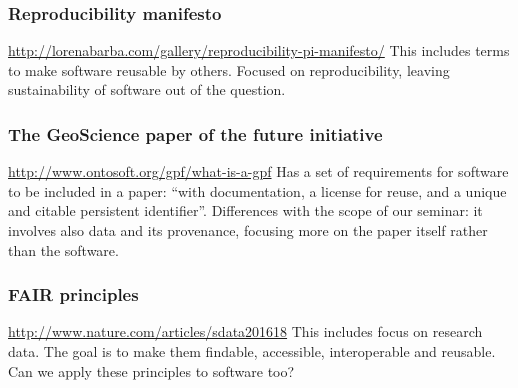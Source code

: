 \documentclass[a4paper,UKenglish]{dagman}
\renewcommand{\paragraph}[1]{\subsubsection*{#1}\xspace}
\begin{document}
\begin{appendix}
\paragraph{Reproducibility manifesto}
\url{http://lorenabarba.com/gallery/reproducibility-pi-manifesto/}
\cite{barba_reproducibility_2012}
This includes terms to make software reusable by others. Focused on reproducibility, leaving sustainability of software out of the question.

\paragraph{The GeoScience paper of the future initiative}
\url{http://www.ontosoft.org/gpf/what-is-a-gpf}
\cite{onto_soft_what_2016}
Has a set of requirements for software to be included in a paper: ``with documentation, a license for reuse, and a unique and citable persistent identifier''. Differences with the scope of our seminar: it involves also data and its provenance, focusing more on the paper itself rather than the software.

\paragraph{FAIR principles}
\url{http://www.nature.com/articles/sdata201618}
\cite{wilkinson_fair_2016}
This includes focus on research data. The goal is to make them findable, accessible, interoperable and reusable. Can we apply these principles to software too?

\end{appendix}
\end{document}

